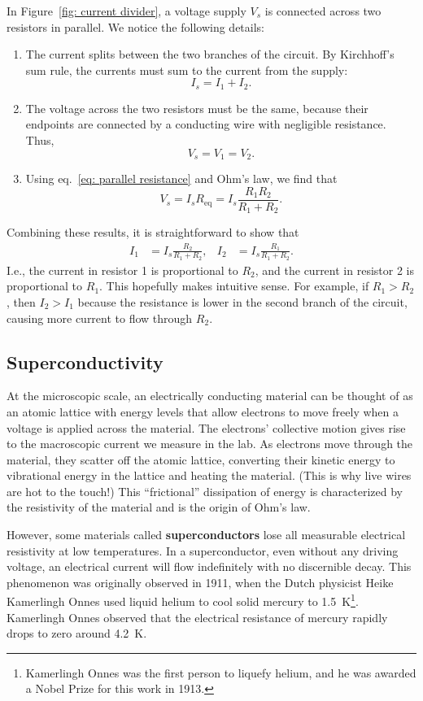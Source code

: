 \documentclass[addpoints]{physlabs}
\begin{document}
\begin{labsection}
\begin{theory}
In Figure~\ref{fig: current divider}, a voltage supply $V_s$ is connected across two resistors in parallel. We notice the following details:

\begin{enumerate}
    \item The current splits between the two branches of the circuit. By Kirchhoff's sum rule, the currents must sum to the current from the supply:
    \[
        I_s = I_1 + I_2.
    \]

    \item The voltage across the two resistors must be the same, because their endpoints are connected by a conducting wire with negligible resistance. Thus,
    \[
        V_s = V_1 = V_2.
    \]

    \item Using eq.~\ref{eq: parallel resistance} and Ohm's law, we find that
    \[
        V_s = I_s R_\text{eq} = I_s\frac{R_1R_2}{R_1+R_2}.
    \]
\end{enumerate}
%
Combining these results, it is straightforward to show that 
%
\begin{align}\label{eq: current divider}
    I_1 &= I_s\frac{R_2}{R_1+R_2},
    &
    I_2 &= I_s\frac{R_1}{R_1+R_2}.
\end{align}
%
I.e., the current in resistor 1 is proportional to $R_2$, and the current in resistor 2 is proportional to $R_1$. This hopefully makes intuitive sense. For example, if $R_1>R_2$, then $I_2>I_1$ because the resistance is lower in the second branch of the circuit, causing more current to flow through $R_2$.

\subsection*{Superconductivity}

At the microscopic scale, an electrically conducting material can be thought of as an atomic lattice with energy levels that allow electrons to move freely when a voltage is applied across the material. The electrons' collective motion gives rise to the macroscopic current we measure in the lab. As electrons move through the material, they scatter off the atomic lattice, converting their kinetic energy to vibrational energy in the lattice and heating the material. (This is why live wires are hot to the touch!) This ``frictional'' dissipation of energy is characterized by the resistivity of the material and is the origin of Ohm's law.

However, some materials called \textbf{superconductors} lose all measurable electrical resistivity at low temperatures. In a superconductor, even without any driving voltage, an electrical current will flow indefinitely with no discernible decay. This phenomenon was originally observed in 1911, when the Dutch physicist Heike Kamerlingh Onnes used liquid helium to cool solid mercury to \qty{1.5}{\kelvin}\footnote{Kamerlingh Onnes was the first person to liquefy helium, and he was awarded a Nobel Prize for this work in 1913.}. Kamerlingh Onnes observed that the electrical resistance of mercury rapidly drops to zero around \qty{4.2}{\kelvin}.


\end{theory}
\end{labsection}
\end{document}
